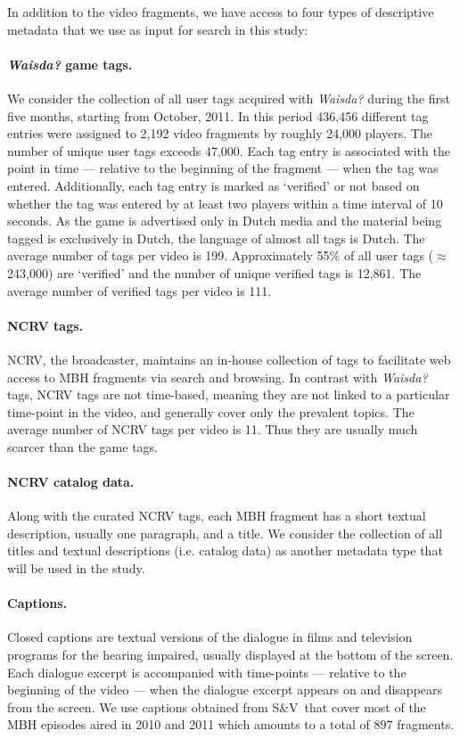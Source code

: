 In addition to the video fragments, we have access to four types of descriptive metadata that we use as input for search in this study:
\paragraph{\textbf{\textit{Waisda?} game tags.}} We consider the collection of all user tags acquired with \textit{Waisda?} during the first five months, starting from October, 2011. In this period 436,456 different tag entries were assigned to 2,192 video fragments by roughly 24,000 players. The number of unique user tags exceeds 47,000. Each tag entry is associated with the point in time --- relative to the beginning of the fragment --- when the tag was entered. Additionally, each tag entry is marked as `verified' or not based on whether the tag was entered by at least two players within a time interval of 10 seconds.
As the game is advertised only in Dutch media and the material being tagged is exclusively in Dutch, the language of almost all tags is Dutch. The average number of tags per video is 199. Approximately 55\% of all user tags ($\approx$ 243,000) are `verified' and the number of unique verified tags is 12,861. The average number of verified tags per video is 111.
\paragraph{\textbf{NCRV tags.}} NCRV, the broadcaster, maintains an in-house collection of tags %
to facilitate web access to MBH fragments via search and browsing. In contrast with \textit{Waisda?} tags, NCRV tags are not time-based, meaning they are not linked to a particular time-point in the video, and generally cover only the prevalent topics. The average number of NCRV tags per video is 11. Thus they are usually much scarcer than the game tags.
\paragraph{\textbf{NCRV catalog data}.} Along with the curated NCRV tags, each MBH fragment has a short textual description, usually one paragraph, and a title. We consider the collection of all titles and textual descriptions (i.e. catalog data) as another metadata type that will be used in the study.
\paragraph{\textbf{Captions}.} %
Closed captions are textual versions of the dialogue in films and television programs for the hearing impaired, usually displayed at the bottom of the screen. Each dialogue excerpt is accompanied with time-points --- relative to the beginning of the video --- when the dialogue excerpt appears on and disappears from the screen. We use captions  obtained from S\&V\ that cover most of the MBH episodes aired in 2010 and 2011 which amounts to a total of 897 fragments. 
 
